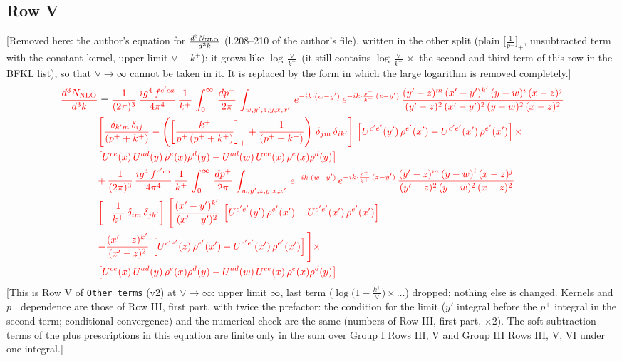 \documentclass[9pt]{article}
\numberwithin{equation}{section}
\begin{document}
\subsection{Row V}
{\color{orange}[Removed here: the author's equation for $\frac{d^{3}N_{\rm NLO}}{d^{3}k}$ (l.208--210 of the author's file), written in the other split (plain $\big[\frac{1}{p^{+}}\big]_{+}$, unsubtracted term with the constant kernel, upper limit $\vee-k^{+}$): it grows like $\log\frac{\vee}{k^{+}}$ (it still contains $\log\frac{\vee}{k^{+}}\times$ the second and third term of this row in the BFKL list), so that $\vee\to\infty$ cannot be taken in it. It is replaced by the form in which the large logarithm is removed completely.]}
\begin{align}
    {\color{red}\frac{d^{3}N_{\rm NLO}}{d^{3}k}} & = {\color{red}\frac{1}{(2\pi)^{3}}\, \frac{ig^{4}\,f^{c'ca}}{4\pi^{4}}\, \frac{1}{k^{+}}\,\int_{0}^{\infty}\, \frac{dp^{+}}{2\pi}\, \int_{w,y',z,y,x,x'}\, e^{-ik\cdot (w-y')}\, e^{-ik\cdot \frac{p^{+}}{k^{+}}\,(z-y')}\,\frac{(y'-z)^{m}\,(x'-y')^{k'}\,(y-w)^{i}\,(x-z)^{j}}{(y'-z)^{2}\,(x'-y')^{2}\,(y-w)^{2}\,(x-z)^{2}}}\notag \\ & {\color{red}\left[\frac{\delta_{k'm}\,\delta_{ij}}{(p^{+}+k^{+})}-\left(\left[\frac{k^{+}}{p^{+}\,(p^{+}+k^{+})}\right]_{+}+\frac{1}{(p^{+}+k^{+})}\right)\,\delta_{jm}\,\delta_{ik'}\right]\, \left[U^{c'e'}(y')\,\rho^{e'}(x')-U^{c'e'}(x')\,\rho^{e'}(x')\right]\times} \notag \\ &  {\color{red}\left[U^{ce}(x)\,U^{ad}(y)\,\rho^{e}(x)\rho^{d}(y)-U^{ad}(w)\,U^{ce}(x)\,\rho^{e}(x)\rho^{d}(y)\right]} \notag \\
&   {\color{red}+\,\frac{1}{(2\pi)^{3}}\, \frac{ig^{4}\,f^{c'ca}}{4\pi^{4}}\, \frac{1}{k^{+}}\,\int_{0}^{\infty}\, \frac{dp^{+}}{2\pi}\, \int_{w,y',z,y,x,x'}\, e^{-ik\cdot (w-y')}\, e^{-ik\cdot \frac{p^{+}}{k^{+}}\,(z-y')}\,\frac{(y'-z)^{m}\,(y-w)^{i}\,(x-z)^{j}}{(y'-z)^{2}\,(y-w)^{2}\,(x-z)^{2}}}\notag \\ &   {\color{red}\left[-\frac{1}{k^{+}}\, \delta_{im}\, \delta_{jk'}\right]\, \Bigg[\frac{(x'-y')^{k'}}{(x'-y')^{2}}\,\left[U^{c'e'}(y')\,\rho^{e'}(x')-U^{c'e'}(x')\,\rho^{e'}(x')\right]}\notag \\ & {\color{red}-\frac{(x'-z)^{k'}}{(x'-z)^{2}}\,\left[U^{c'e'}(z)\,\rho^{e'}(x')-U^{c'e'}(x')\,\rho^{e'}(x')\right]\Bigg]\times} \notag \\ &    {\color{red}\left[U^{ce}(x)\,U^{ad}(y)\,\rho^{e}(x)\rho^{d}(y)-U^{ad}(w)\,U^{ce}(x)\,\rho^{e}(x)\rho^{d}(y)\right]}
\end{align}
{\color{red}[This is Row V of \texttt{Other\_terms} (v2) at $\vee\to\infty$: upper limit $\infty$, last term ($\log\big(1-\frac{k^{+}}{\vee}\big)\times\dots$) dropped; nothing else is changed. Kernels and $p^{+}$ dependence are those of Row III, first part, with twice the prefactor: the condition for the limit ($y'$ integral before the $p^{+}$ integral in the second term; conditional convergence) and the numerical check are the same (numbers of Row III, first part, $\times2$). The soft subtraction terms of the plus prescriptions in this equation are finite only in the sum over Group I Rows III, V and Group III Rows III, V, VI under one integral.]}\par\noindent
\end{document}
